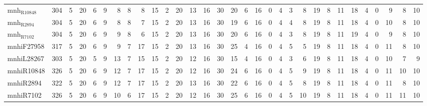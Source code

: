 \begin{center}
\begin{tabular}{lrrrrrrrrrrrrrrrrrrrrrrrrrrrrrr}
mnh$_{\text{R10848}}$ & 304 & 5 & 20 & 6 & 9 & 8 & 8 & 8 & 15 & 2 & 20 & 13 & 16 & 30 & 20 & 6 & 16 & 0 & 4 & 3 & 8 & 19 & 8 & 11 & 18 & 4 & 0 & 9 & 8 & 10\\
mnh$_{\text{R2894}}$ & 304 & 5 & 20 & 6 & 9 & 8 & 8 & 7 & 15 & 2 & 20 & 13 & 16 & 30 & 19 & 6 & 16 & 0 & 4 & 4 & 8 & 19 & 8 & 11 & 18 & 4 & 0 & 10 & 8 & 10\\
mnh$_{\text{R7102}}$ & 304 & 5 & 20 & 6 & 9 & 9 & 8 & 6 & 15 & 2 & 20 & 13 & 16 & 30 & 20 & 6 & 16 & 0 & 4 & 3 & 8 & 19 & 8 & 11 & 19 & 4 & 0 & 9 & 8 & 10\\
mnhiF27958 & 317 & 5 & 20 & 6 & 9 & 9 & 7 & 17 & 15 & 2 & 20 & 13 & 16 & 30 & 25 & 4 & 16 & 0 & 4 & 5 & 5 & 19 & 8 & 11 & 18 & 4 & 0 & 11 & 8 & 10\\
mnhiL28267 & 303 & 5 & 20 & 5 & 9 & 13 & 7 & 15 & 15 & 2 & 20 & 12 & 16 & 30 & 15 & 4 & 16 & 0 & 4 & 3 & 6 & 19 & 8 & 11 & 18 & 4 & 0 & 10 & 7 & 9\\
mnhiR10848 & 326 & 5 & 20 & 6 & 9 & 12 & 7 & 17 & 15 & 2 & 20 & 12 & 16 & 30 & 24 & 6 & 16 & 0 & 4 & 5 & 9 & 19 & 8 & 11 & 18 & 4 & 0 & 11 & 10 & 10\\
mnhiR2894 & 322 & 5 & 20 & 6 & 9 & 12 & 7 & 17 & 15 & 2 & 20 & 13 & 16 & 30 & 22 & 6 & 16 & 0 & 4 & 5 & 8 & 19 & 8 & 11 & 18 & 4 & 0 & 11 & 8 & 10\\
mnhiR7102 & 326 & 5 & 20 & 6 & 9 & 10 & 6 & 17 & 15 & 2 & 20 & 12 & 16 & 30 & 25 & 6 & 16 & 0 & 4 & 5 & 10 & 19 & 8 & 11 & 18 & 4 & 0 & 11 & 11 & 10\\
\end{tabular}
\end{center}
